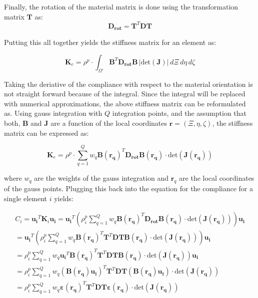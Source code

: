 Finally, the rotation of the material matrix is done using the transformation matrix \(\mathbf{T}\) as:
\begin{equation}
\mathbf{D_{\text{rot}}} = \mathbf{T}^T \mathbf{D} \mathbf{T}
\end{equation}

Putting this all together yields the stiffness matrix for an element as:

\begin{equation}
\mathbf{K}_e = \rho^p \cdot \int_{\Omega'} \mathbf{B}^T \mathbf{D_{\text{rot}}} \mathbf{B} \, |\text{det}(\mathbf{J})| \, d\Xi \, d\eta \, d\zeta
\end{equation}

Taking the deriative of the compliance with respect to the material orientation is not straight forward because of the integral.
Since the integral will be replaced with numerical approximations, the above stiffness matrix can be reformulated as.
Using gauss integration with \(Q\) integration points, and the assumption that both, $\mathbf{B}$ and $\mathbf{J}$ are a function of the local coordinates $\mathbf{r} = (\Xi, \eta, \zeta)$, the stiffness matrix can be expressed as:

\begin{equation}
\mathbf{K}_e = \rho^p \cdot \sum_{q=1}^Q w_q \mathbf{B(\mathbf{r}_q)}^T \mathbf{D_{\text{rot}}} \mathbf{B(\mathbf{r}_q)} \cdot \text{det}(\mathbf{J(\mathbf{r}_q)})
\end{equation}

where $w_q$ are the weights of the gauss integration and $\mathbf{r}_q$ are the local coordinates of the gauss points.
Plugging this back into the equation for the compliance for a single element $i$ yields:

\begin{align}
C_i = \mathbf{u_i}^T \mathbf{K}_i \mathbf{u_i} = \mathbf{u_i}^T \left( \rho_i^p \sum_{q=1}^Q w_q \mathbf{B(\mathbf{r}_q)}^T \mathbf{D_{\text{rot}}} \mathbf{B(\mathbf{r}_q)} \cdot \text{det}(\mathbf{J(\mathbf{r}_q)}) \right) \mathbf{u_i} \\
    = \mathbf{u_i}^T \left( \rho_i^p \sum_{q=1}^Q w_q \mathbf{B(\mathbf{r}_q)}^T \mathbf{T}^T \mathbf{D} \mathbf{T} \mathbf{B(\mathbf{r}_q)} \cdot \text{det}(\mathbf{J(\mathbf{r}_q)}) \right) \mathbf{u_i}\\
    = \rho_i^p \sum_{q=1}^Q w_q \mathbf{u_i}^T \mathbf{B(\mathbf{r}_q)}^T \mathbf{T}^T \mathbf{D} \mathbf{T} \mathbf{B(\mathbf{r}_q)} \cdot \text{det}(\mathbf{J(\mathbf{r}_q)}) \mathbf{u_i}\\
    = \rho_i^p \sum_{q=1}^Q w_q (\mathbf{B(\mathbf{r}_q)} \mathbf{u_i})^T  \mathbf{T}^T \mathbf{D} \mathbf{T} (\mathbf{B(\mathbf{r}_q)} \mathbf{u_i} ) \cdot \text{det}(\mathbf{J(\mathbf{r}_q)})\\
    = \rho_i^p \sum_{q=1}^Q w_q \mathbf{\varepsilon(\mathbf{r}_q)}^T  \mathbf{T}^T \mathbf{D} \mathbf{T} \mathbf{\varepsilon(\mathbf{r}_q)} \cdot \text{det}(\mathbf{J(\mathbf{r}_q)})\\
\end{align}

